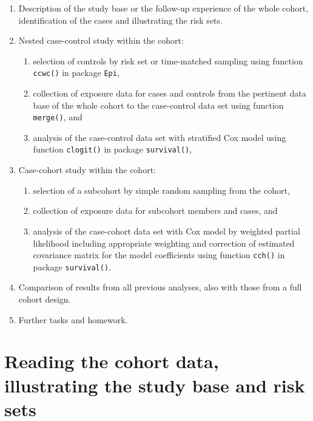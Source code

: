 \documentclass[
]{book}
\providecommand{\tightlist}{%
  \setlength{\itemsep}{0pt}\setlength{\parskip}{0pt}}
\theoremstyle{definition}
\theoremstyle{definition}
\theoremstyle{definition}
\theoremstyle{definition}
\theoremstyle{remark}
\begin{document}
\begin{enumerate}
\def\labelenumi{\arabic{enumi}.}
\item
  Description of the study base or the follow-up experience of the
  whole cohort, identification of the cases and illustrating the risk sets.
\item
  Nested case-control study within the cohort:

  \begin{enumerate}
  \def\labelenumii{(\roman{enumii})}
  \tightlist
  \item
    selection of controls by risk set or time-matched sampling
    using function \texttt{ccwc()} in package \texttt{Epi},
  \item
    collection of exposure data for cases and controls
    from the pertinent data base of the whole cohort to the
    case-control data set using function \texttt{merge()}, and
  \item
    analysis of the case-control data set with stratified Cox
    model using function \texttt{clogit()} in package \texttt{survival()},
  \end{enumerate}
\item
  Case-cohort study within the cohort:

  \begin{enumerate}
  \def\labelenumii{(\roman{enumii})}
  \tightlist
  \item
    selection of a subcohort by simple random sampling from the cohort,
  \item
    collection of exposure data for subcohort members and cases, and
  \item
    analysis of the case-cohort data set with Cox model by weighted partial
    likelihood including appropriate weighting and correction of estimated
    covariance matrix for the model coefficients using function \texttt{cch()} in package \texttt{survival()}.
  \end{enumerate}
\item
  Comparison of results from all previous analyses, also with those from a full cohort design.
\item
  Further tasks and homework.
\end{enumerate}

\section{Reading the cohort data, illustrating the study base and risk sets}\label{reading-the-cohort-data-illustrating-the-study-base-and-risk-sets}
\end{document}
